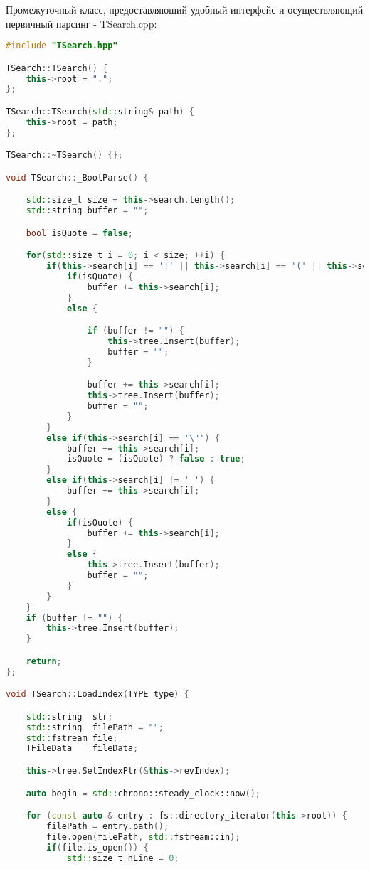 Промежуточный класс, предоставляющий удобный интерфейс и осуществляющий первичный парсинг - TSearch.cpp:
\begin{lstlisting}[language=C++]
#include "TSearch.hpp"

TSearch::TSearch() {
    this->root = ".";
};

TSearch::TSearch(std::string& path) {
    this->root = path;
};

TSearch::~TSearch() {};

void TSearch::_BoolParse() {

    std::size_t size = this->search.length();
    std::string buffer = "";

    bool isQuote = false;

    for(std::size_t i = 0; i < size; ++i) {
        if(this->search[i] == '!' || this->search[i] == '(' || this->search[i] == ')') {
            if(isQuote) {
                buffer += this->search[i];
            }
            else {

                if (buffer != "") {
                    this->tree.Insert(buffer);
                    buffer = "";
                }

                buffer += this->search[i];
                this->tree.Insert(buffer);
                buffer = "";
            }
        }
        else if(this->search[i] == '\"') {
            buffer += this->search[i];
            isQuote = (isQuote) ? false : true;
        }
        else if(this->search[i] != ' ') {
            buffer += this->search[i];
        }
        else {
            if(isQuote) {
                buffer += this->search[i];
            }
            else {
                this->tree.Insert(buffer);
                buffer = "";
            }
        }
    }
    if (buffer != "") {
        this->tree.Insert(buffer);
    }

    return;
};

void TSearch::LoadIndex(TYPE type) {

    std::string  str;
    std::string  filePath = "";
    std::fstream file;
    TFileData    fileData;

    this->tree.SetIndexPtr(&this->revIndex);

    auto begin = std::chrono::steady_clock::now();

    for (const auto & entry : fs::directory_iterator(this->root)) {
        filePath = entry.path();
        file.open(filePath, std::fstream::in);
        if(file.is_open()) {
            std::size_t nLine = 0;


\end{lstlisting}

